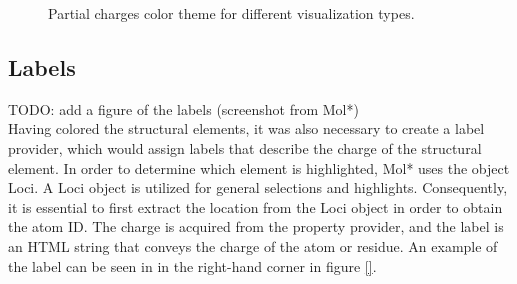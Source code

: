 \documentclass[
  digital,     %
  oneside,     %
  nosansbold,  %
  nocolorbold, %
  lof,         %
  lot,         %
]{fithesis4}
\begin{document}
\begin{figure}[htbp]
  \centering
  \caption{Partial charges color theme for different visualization types.}
  \label{fig:partial_charges_color_theme}
\end{figure}

\subsection{Labels}
\label{subsection:labels}

TODO: add a figure of the labels (screenshot from Mol*) \\

Having colored the structural elements, it was also necessary to create a label provider, which would assign labels that describe the charge of the structural element. In order to determine which element is highlighted, Mol* uses the object Loci. A Loci object is utilized for general selections and highlights. Consequently, it is essential to first extract the location from the Loci object in order to obtain the atom ID. The charge is acquired from the property provider, and the label is an HTML string that conveys the charge of the atom or residue. An example of the label can be seen in in the right-hand corner in figure \ref{}.
\end{document}
